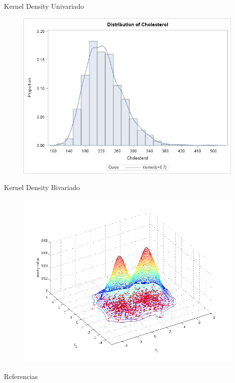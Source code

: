 \documentclass[11pt]{beamer}
\begin{document}
\begin{frame}{Kernel Density Univariado}
	\begin{figure}
		\includegraphics[scale=0.6]{images/KDECholesterol}
	\end{figure}
\end{frame}

\begin{frame}{Kernel Density Bivariado}
	\vspace{-0.2cm}
	\begin{figure}
		\includegraphics[scale=0.5]{images/Bivariate_example}
	\end{figure}
\end{frame}

\begin{frame}{Referencias}
 

\end{frame}
\end{document}
